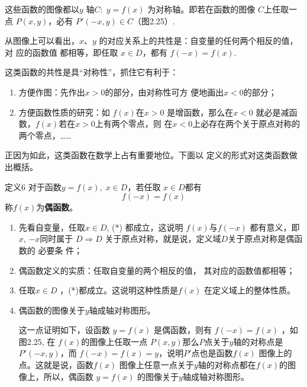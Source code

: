 这些函数的图像都以$y$
轴$C:\; y=f(x)$
为对称轴。即若在函数的图像
$C$上任取一点
$P(x,y)$，必有
$P'(-x,y)\in C$（图2.25）.

\begin{figure}[htp]
    \centering
{}
    \caption{}
\end{figure}



从图像上可以看出，$x$、$y$
的对应关系上的共性是：自变量的任何两个相反的值，对
应的函数值 都相等，即任取
$x\in D$，都有
$f(-x)=f(x)$.

这类函数的共性是具“对称性”，抓住它有利于：
\begin{enumerate}[(1)]
    \item 方便作图：先作出$x>0$的部分，由对称性可方
    便地画出$x<0$的部分；
    \item 方便函数性质的研究：如
    $f(x)$在$x>0$
    是增函数，那么在$x<0$
    就必是减函数，$f(x)$若在$x>0$上有两个零点，则
    在$x<0$上必存在两个关于原点对称的两个零点，……
\end{enumerate}

正因为如此，这类函数在数学上占有重要地位。下面以
    定义的形式对这类函数做出概括。


\begin{thm}{定义6}
  对于函数$y=f(x),\; x\in D$，若任取
$x\in D$都有
\begin{equation}
    f(-x)=f(x)\tag{*}
\end{equation}
称$f(x)$为\textbf{偶函数}。  
\end{thm}

\begin{note}
\begin{enumerate}
    \item 先看自变量，任取$x\in D$, (*)
都成立，这说明
$f(x)$与$f(-x)$
都有意义，即$x$, $-x$同时属于
$D\Longrightarrow D$
关于原点对称，就是说，定义域$D$关于原点对称是偶函数的 必要条
件；
\item 偶函数定义的实质：任取自变量的两个相反的值，
其对应的函数值都相等；
\item 任取$x\in D$
，(*)都成立。这说明这种性质是$f(x)$
在定义域上的整体性质。
\item 偶函数的图像关于$y$轴成轴对称图形。

这一点证明如下，设函数
$y=f(x)$
是偶函数，则有
$f(-x)=f(x)$
，如图2.25, 在
$f(x)$的图像上任取一点
$P(x,y)$那么$P$点关于$y$轴的对称点是
$P'(-x,y)$，而
$f(-x)=f(x)=y$，说明$P'$点也是函数$f(x)$
图像上的点。这就是说，函数$f(x)$
图像上任意一点关于$y$轴的对称点都在$f(x)$的图像上，所以，偶函数
$y=f(x)$
的图像关于$y$轴成轴对称图形。
\end{enumerate}
\end{note}

